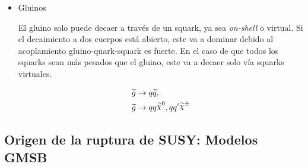 \begin{itemize}
\item Gluinos

  El gluino solo puede decaer a través de un squark, ya sea \emph{on-shell} o virtual. Si
  el decaimiento a dos cuerpos está abierto, este va a dominar debido al
  acoplamiento gluino-quark-squark es fuerte. En el caso de que todos
  los squarks sean más pesados que el gluino, este va a decaer solo vía squarks
  virtuales.

  \begin{align}
    &\gluino \to q\susy{q}, \\
    &\gluino \to qq\nino, qq^\prime \chinopm
  \end{align}

\end{itemize}



\subsection{Origen de la ruptura de SUSY: Modelos GMSB}




